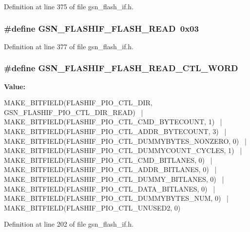 Definition at line 375 of file gsn\_\-flash\_\-if.h.

\hypertarget{a00501_a79c1ea37a5d7bb3e038e7d67837c64ee}{
\subsubsection[{GSN\_\-FLASHIF\_\-FLASH\_\-READ}]{\setlength{\rightskip}{0pt plus 5cm}\#define GSN\_\-FLASHIF\_\-FLASH\_\-READ~0x03}}
\label{a00501_a79c1ea37a5d7bb3e038e7d67837c64ee}


Definition at line 377 of file gsn\_\-flash\_\-if.h.

\hypertarget{a00501_ae7096c4b9fdda3ba1d4ea1c604c99286}{
\subsubsection[{GSN\_\-FLASHIF\_\-FLASH\_\-READ\_\-CTL\_\-WORD}]{\setlength{\rightskip}{0pt plus 5cm}\#define GSN\_\-FLASHIF\_\-FLASH\_\-READ\_\-CTL\_\-WORD}}
\label{a00501_ae7096c4b9fdda3ba1d4ea1c604c99286}
{\bfseries Value:}
\begin{DoxyCode}
MAKE_BITFIELD(FLASHIF_PIO_CTL_DIR, GSN_FLASHIF_PIO_CTL_DIR_READ) \
        | MAKE_BITFIELD(FLASHIF_PIO_CTL_CMD_BYTECOUNT, 1) \
        | MAKE_BITFIELD(FLASHIF_PIO_CTL_ADDR_BYTECOUNT, 3) \
        | MAKE_BITFIELD(FLASHIF_PIO_CTL_DUMMYBYTES_NONZERO, 0) \
        | MAKE_BITFIELD(FLASHIF_PIO_CTL_DUMMYCOUNT_CYCLES, 1) \
        | MAKE_BITFIELD(FLASHIF_PIO_CTL_CMD_BITLANES, 0) \
        | MAKE_BITFIELD(FLASHIF_PIO_CTL_ADDR_BITLANES, 0) \
        | MAKE_BITFIELD(FLASHIF_PIO_CTL_DUMMY_BITLANES, 0) \
        | MAKE_BITFIELD(FLASHIF_PIO_CTL_DATA_BITLANES, 0) \
        | MAKE_BITFIELD(FLASHIF_PIO_CTL_DUMMYBYTES_NUM, 0) \
        | MAKE_BITFIELD(FLASHIF_PIO_CTL_UNUSED2, 0)
\end{DoxyCode}


Definition at line 202 of file gsn\_\-flash\_\-if.h.

